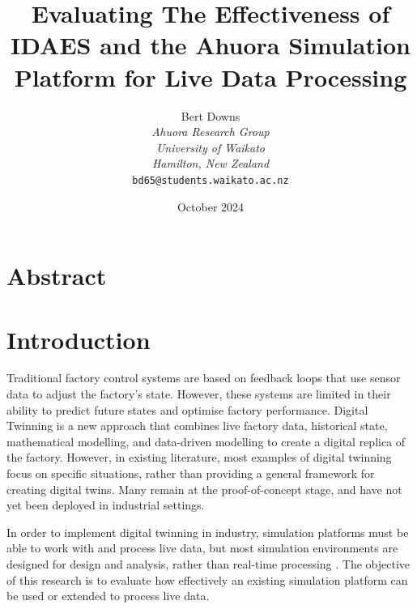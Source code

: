 \documentclass[12pt]{article}
\title{Evaluating The Effectiveness of IDAES and the Ahuora Simulation Platform for Live Data Processing}
\author{Bert Downs\\
\textit{Ahuora Research Group}\\
\textit{University of Waikato}\\
\textit{Hamilton, New Zealand}\\
\texttt{bd65@students.waikato.ac.nz}}
\date{October 2024}
\begin{document}
\maketitle

\section*{Abstract}



\section{Introduction}

Traditional factory control systems are based on feedback loops that use sensor data to adjust the factory's state. However, these systems are limited in their ability to predict future states and optimise factory performance. Digital Twinning is a new approach that combines live factory data, historical state, mathematical modelling, and data-driven modelling to create a digital replica of the factory. 
However, in existing literature, most examples of digital twinning focus on specific situations, rather than providing a general framework for creating digital twins. Many remain at the proof-of-concept stage, and have not yet been deployed in industrial settings.

In order to implement digital twinning in industry, simulation platforms must be able to work with and process live data, but most simulation environments are designed for design and analysis, rather than real-time processing \cite{agi2024computational}. The objective of this research is to evaluate how effectively an existing simulation platform can be used or extended to process live data.
\end{document}
